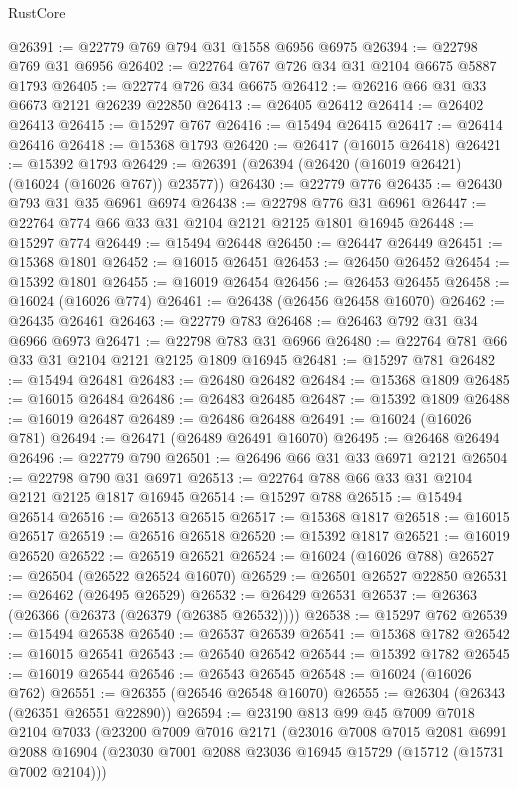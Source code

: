 \begin{lexlean}{RustCore}
\begin{coremodule}
@26391 := @22779 @769 @794 @31 @1558 @6956 @6975
@26394 := @22798 @769 @31 @6956
@26402 := @22764 @767 @726 @34 @31 @2104 @6675 @5887 @1793
@26405 := @22774 @726 @34 @6675
@26412 := @26216 @66 @31 @33 @6673 @2121 @26239 @22850
@26413 := @26405 @26412
@26414 := @26402 @26413
@26415 := @15297 @767
@26416 := @15494 @26415
@26417 := @26414 @26416
@26418 := @15368 @1793
@26420 := @26417 (@16015 @26418)
@26421 := @15392 @1793
@26429 := @26391 (@26394 (@26420 (@16019 @26421) (@16024 (@16026 @767)) @23577))
@26430 := @22779 @776
@26435 := @26430 @793 @31 @35 @6961 @6974
@26438 := @22798 @776 @31 @6961
@26447 := @22764 @774 @66 @33 @31 @2104 @2121 @2125 @1801 @16945
@26448 := @15297 @774
@26449 := @15494 @26448
@26450 := @26447 @26449
@26451 := @15368 @1801
@26452 := @16015 @26451
@26453 := @26450 @26452
@26454 := @15392 @1801
@26455 := @16019 @26454
@26456 := @26453 @26455
@26458 := @16024 (@16026 @774)
@26461 := @26438 (@26456 @26458 @16070)
@26462 := @26435 @26461
@26463 := @22779 @783
@26468 := @26463 @792 @31 @34 @6966 @6973
@26471 := @22798 @783 @31 @6966
@26480 := @22764 @781 @66 @33 @31 @2104 @2121 @2125 @1809 @16945
@26481 := @15297 @781
@26482 := @15494 @26481
@26483 := @26480 @26482
@26484 := @15368 @1809
@26485 := @16015 @26484
@26486 := @26483 @26485
@26487 := @15392 @1809
@26488 := @16019 @26487
@26489 := @26486 @26488
@26491 := @16024 (@16026 @781)
@26494 := @26471 (@26489 @26491 @16070)
@26495 := @26468 @26494
@26496 := @22779 @790
@26501 := @26496 @66 @31 @33 @6971 @2121
@26504 := @22798 @790 @31 @6971
@26513 := @22764 @788 @66 @33 @31 @2104 @2121 @2125 @1817 @16945
@26514 := @15297 @788
@26515 := @15494 @26514
@26516 := @26513 @26515
@26517 := @15368 @1817
@26518 := @16015 @26517
@26519 := @26516 @26518
@26520 := @15392 @1817
@26521 := @16019 @26520
@26522 := @26519 @26521
@26524 := @16024 (@16026 @788)
@26527 := @26504 (@26522 @26524 @16070)
@26529 := @26501 @26527 @22850
@26531 := @26462 (@26495 @26529)
@26532 := @26429 @26531
@26537 := @26363 (@26366 (@26373 (@26379 (@26385 @26532))))
@26538 := @15297 @762
@26539 := @15494 @26538
@26540 := @26537 @26539
@26541 := @15368 @1782
@26542 := @16015 @26541
@26543 := @26540 @26542
@26544 := @15392 @1782
@26545 := @16019 @26544
@26546 := @26543 @26545
@26548 := @16024 (@16026 @762)
@26551 := @26355 (@26546 @26548 @16070)
@26555 := @26304 (@26343 (@26351 @26551 @22890))
@26594 := @23190
    @813
    @99
    @45
    @7009
    @7018
    @2104
    @7033
    (@23200
      @7009
      @7016
      @2171
      (@23016
        @7008
        @7015
        @2081
        @6991
        @2088
        @16904
        (@23030 @7001 @2088 @23036 @16945 @15729 (@15712 (@15731 @7002 @2104)))

\end{coremodule}
\end{lexlean}
